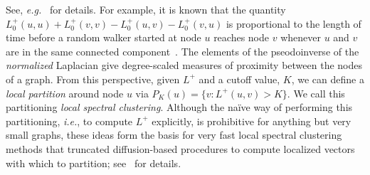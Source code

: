 \documentclass[12pt]{article}
\theoremstyle{plain}
\begin{document}
See, \emph{e.g.}~\cite{chebotarev1998proximity} for details.  
For example, 
it is known that the
quantity $L_0^{+} (u,u) + L_0^{+} (v,v) - L_0^{+} (u,v) - L_0^{+} (v,u)$ is
proportional to the length of time before a random walker started at
node $u$ reaches node $v$ whenever $u$ and $v$ are in the same
connected component~\cite{chandra1989electrical}.  The elements
of the pseodoinverse of the \emph{normalized} Laplacian give degree-scaled
measures of proximity between the nodes of a graph.
From this perspective, given $L^{+}$ and a cutoff value, $K$, we can 
define a \emph{local partition} around node $u$ via 
$P_K(u) = \{ v : L^{+}(u,v) > K \}$.  
We call this partitioning \emph{local spectral clustering}.
Although the na\"{i}ve way of performing this partitioning, \emph{i.e.}, to 
compute $L^{+}$ explicitly, is prohibitive for anything but very small 
graphs, these ideas form the basis for very fast local spectral clustering 
methods that truncated diffusion-based procedures to compute localized 
vectors with which to partition; 
see~\cite{Spielman:2004,andersen06local,Chung07_heatkernelPNAS,MOV09_TRv2} 
for details.
\end{document}
